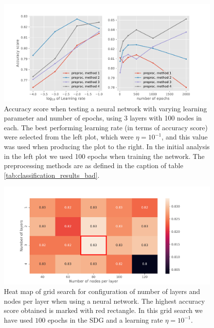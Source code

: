 \begin{figure}[!h]
    \centering
    \includegraphics[scale=0.6]{Figures/Classification/class-eta-accuracy_full_analysis_analysis2.pdf}
    \caption{Accuracy score when testing a neural network with varying learning parameter and number of epochs, using 3 layers with 100 nodes in each. The best performing learning rate (in terms of accuracy score) were selected from the left plot, which were $\eta = 10^{-1}$, and this value was used when producing the plot to the right. In the initial analysis in the left plot we used 100 epochs when training the network. The preprocessing methods are as defined in the caption of table \ref{tab:classification_results_bad}.}
    \label{fig:eta_epoch_analysis_nn}
\end{figure}
\begin{figure}[!h]
    \centering
    \includegraphics[scale=0.6]{Figures/Classification/class_heatmap_analysis2_hl-100-100-100_maxepochsoptimal10000.pdf}
    \caption{Heat map of grid search for configuration of number of layers and nodes per layer when using a neural network. The highest accuracy score obtained is marked with red rectangle. In this grid search we have used $100$ epochs in the SDG and a learning rate $\eta = 10^{-1}$.}
    \label{fig:heatmap_nn_classification}
\end{figure}

